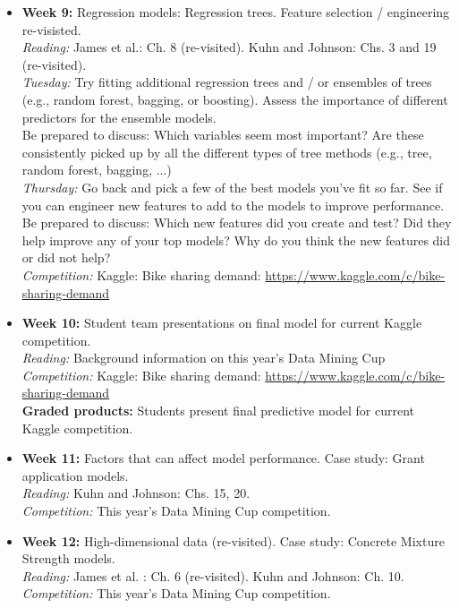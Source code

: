 \documentclass[11pt,oneside]{amsart}
\begin{document}
\begin{itemize}
\item \textbf{Week 9:} Regression models: Regression trees. Feature selection /
  engineering re-visisted.\\
\emph{Reading:} James et al.: Ch. 8 (re-visited). Kuhn and Johnson:
Chs. 3 and 19 (re-visited).\\
\emph{Tuesday:} Try fitting additional regression trees and / or ensembles of trees (e.g., random forest, bagging, or boosting). Assess the importance of different predictors for the ensemble models.\\
Be prepared to discuss: Which variables seem most important? Are these consistently picked up by all the different types of tree methods (e.g., tree, random forest, bagging, ...)\\
\emph{Thursday:} Go back and pick a few of the best models you've fit so far. See if you can engineer new features to add to the models to improve performance.\\ 
Be prepared to discuss: Which new features did you create and test? Did they help improve any of your top models? Why do you think the new features did or did not help?\\
\emph{Competition:} Kaggle: Bike sharing demand: \url{https://www.kaggle.com/c/bike-sharing-demand}

\item \textbf{Week 10:} Student team presentations on final model for current Kaggle
  competition.\\
\emph{Reading:} Background information on this year's Data Mining Cup\\
\emph{Competition:} Kaggle: Bike sharing demand: \url{https://www.kaggle.com/c/bike-sharing-demand}\\
\textbf{Graded products:} Students present final predictive model for
current Kaggle competition.\\

\item \textbf{Week 11:} Factors that can affect model performance. Case study: Grant application models. \\
\emph{Reading:} Kuhn and Johnson: Chs. 15, 20. \\
\emph{Competition:} This year's Data Mining Cup competition.

\item \textbf{Week 12:} High-dimensional data (re-visited). Case study: Concrete Mixture Strength models.\\
\emph{Reading:} James et al. : Ch. 6 (re-visited). Kuhn and Johnson: Ch. 10.\\
\emph{Competition:} This year's Data Mining Cup competition.


\end{itemize}
\end{document}
